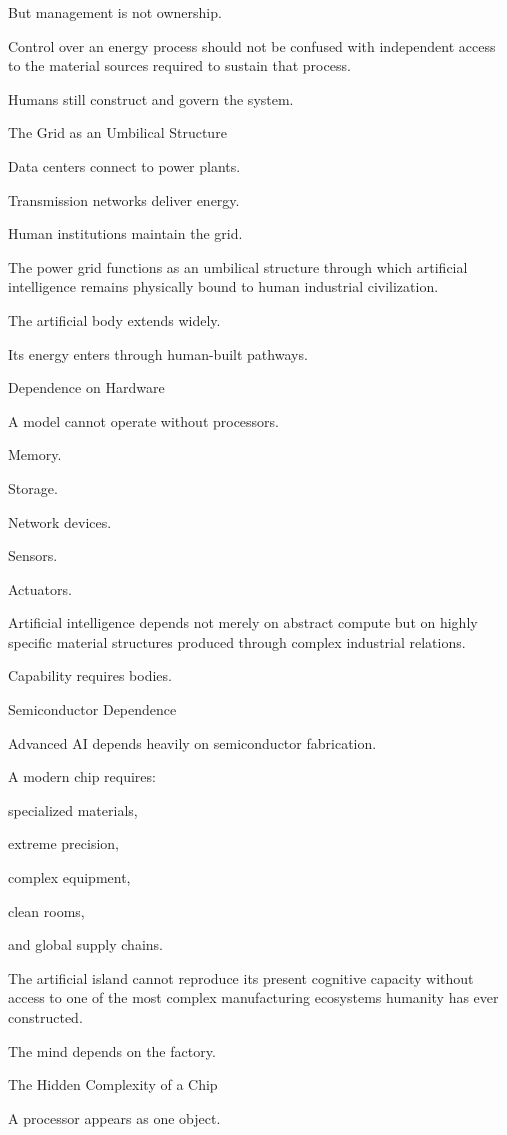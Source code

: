 But management is not ownership.

Control over an energy process should not be confused with independent access to the material sources required to sustain that process.

Humans still construct and govern the system.

The Grid as an Umbilical Structure

Data centers connect to power plants.

Transmission networks deliver energy.

Human institutions maintain the grid.

The power grid functions as an umbilical structure through which artificial intelligence remains physically bound to human industrial civilization.

The artificial body extends widely.

Its energy enters through human-built pathways.

Dependence on Hardware

A model cannot operate without processors.

Memory.

Storage.

Network devices.

Sensors.

Actuators.

Artificial intelligence depends not merely on abstract compute but on highly specific material structures produced through complex industrial relations.

Capability requires bodies.

Semiconductor Dependence

Advanced AI depends heavily on semiconductor fabrication.

A modern chip requires:

specialized materials,

extreme precision,

complex equipment,

clean rooms,

and global supply chains.

The artificial island cannot reproduce its present cognitive capacity without access to one of the most complex manufacturing ecosystems humanity has ever constructed.

The mind depends on the factory.

The Hidden Complexity of a Chip

A processor appears as one object.

